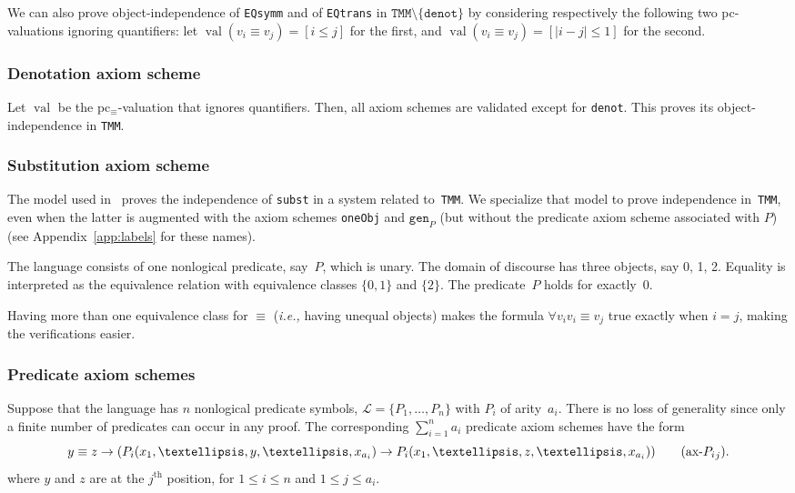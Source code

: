 \documentclass[11pt]{article}
\newcommand*{\calL}{\mathcal{L}}
\DeclareMathOperator{\val}{val}
\theoremstyle{plain}
\theoremstyle{definition}
\theoremstyle{remark}
\begin{document}
We can also prove object-independence of \texttt{EQsymm} and of \texttt{EQtrans} in
$\texttt{TMM} \setminus \{ \texttt{denot} \}$ by considering respectively the following two
pc-valuations ignoring quantifiers: let $\val(v_i \equiv v_j) = [i \leq j]$ for the first, and
$\val(v_i \equiv v_j) = [|i-j| \leq 1]$ for the second.



\subsubsection{Denotation axiom scheme}

Let $\val$ be the pc$_\equiv$-valuation that ignores quantifiers.
Then, all axiom schemes are validated except for \texttt{denot}.
This proves its object-independence in \texttt{TMM}.



\subsubsection{Substitution axiom scheme}

The model used in~\cite[Thm.~9, Part~8 (C8)]{monk} proves the independence of \texttt{subst} in a
system related to~\texttt{TMM}.
We specialize that model to prove independence in~\texttt{TMM}, even when the latter is augmented
with the axiom schemes \texttt{oneObj} and $\texttt{gen}_P$
(but without the predicate axiom scheme associated with $P$)
(see Appendix~\ref{app:labels} for these names).

The language consists of one nonlogical predicate, say~$P$, which is unary.
The domain of discourse has three objects, say 0, 1, 2.
Equality is interpreted as the equivalence relation with equivalence classes $\{0, 1\}$ and $\{2\}$.
The predicate~$P$ holds for exactly~0.

Having more than one equivalence class for $\equiv$ (\textit{i.e.,} having unequal objects) makes
the formula $\forall v_i v_i \equiv v_j$ true exactly when $i = j$, making the verifications easier.



\subsubsection{Predicate axiom schemes}

Suppose that the language has $n$ nonlogical predicate symbols, $\calL = \{ P_1, \ldots, P_n \}$
with $P_i$ of arity~$a_i$.
There is no loss of generality since only a finite number of predicates can occur in any proof.
The corresponding $\sum_{i=1}^n a_i$ predicate axiom schemes have the form
\begin{equation}
y \equiv z \to (P_i(x_1, \ldots, y, \ldots, x_{a_i}) \to P_i(x_1, \ldots, z, \ldots, x_{a_i}))
\tag{\texttt{ax-${P_i}_j$}}.
\end{equation}
where $y$ and $z$ are at the $j^{\mathrm{th}}$ position, for $1 \leq i \leq n$ and $1 \leq j\leq a_i$.
\end{document}
